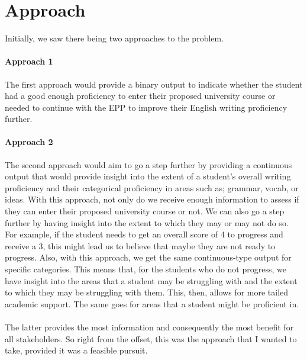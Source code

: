 \section{Approach}

Initially, we saw there being two approaches to the problem. 

\paragraph{Approach 1} The first approach would provide a binary output to indicate whether the student had a good enough proficiency to enter their proposed university course or needed to continue with the EPP to improve their English writing proficiency further.

\paragraph{Approach 2}
The second approach would aim to go a step further by providing a continuous output that would provide insight into the extent of a student's overall writing proficiency and their categorical proficiency in areas such as; grammar, vocab, or ideas. With this approach, not only do we receive enough information to assess if they can enter their proposed university course or not. We can also go a step further by having insight into the extent to which they may or may not do so. For example, if the student needs to get an overall score of 4 to progress and receive a 3, this might lead us to believe that maybe they are not ready to progress. Also, with this approach, we get the same continuous-type output for specific categories. This means that, for the students who do not progress, we have insight into the areas that a student may be struggling with and the extent to which they may be struggling with them. This, then, allows for more tailed academic support. The same goes for areas that a student might be proficient in. 

\paragraph{}The latter provides the most information and consequently the most benefit for all stakeholders. So right from the offset, this was the approach that I wanted to take, provided it was a feasible pursuit.
